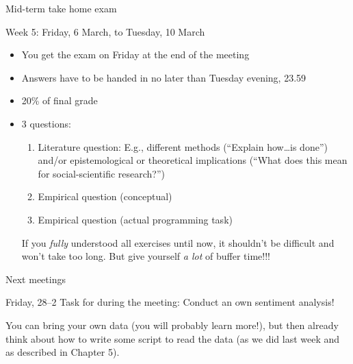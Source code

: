 \documentclass{beamer}
\begin{document}
\begin{frame}{Mid-term take home exam}
\begin{block}{Week 5: Friday, 6 March, to Tuesday, 10 March}
\begin{itemize}
\item You get the exam on Friday at the end of the meeting
\item Answers have to be handed in no later than Tuesday evening, 23.59
\item 20\% of final grade
\item 3 questions:
\begin{enumerate}
\item Literature question: E.g., different methods (``Explain how\ldots is done'') and/or epistemological or theoretical implications (``What does this mean for social-scientific research?'')
\item Empirical question (conceptual)
\item Empirical question (actual programming task)
\end{enumerate}
If you \emph{fully} understood all exercises until now, it shouldn't be difficult and won't take too long. But give yourself \emph{a lot} of buffer time!!! 
\end{itemize}
\end{block}
\end{frame}



\begin{frame}{Next meetings}
\begin{block}{Friday, 28--2}
Task for during the meeting: Conduct an own sentiment analysis!

You can bring your own data (you will probably learn more!), but then already think about how to write some script to read the data (as we did last week and as described in Chapter 5).
\end{block}

\end{frame}
\end{document}
